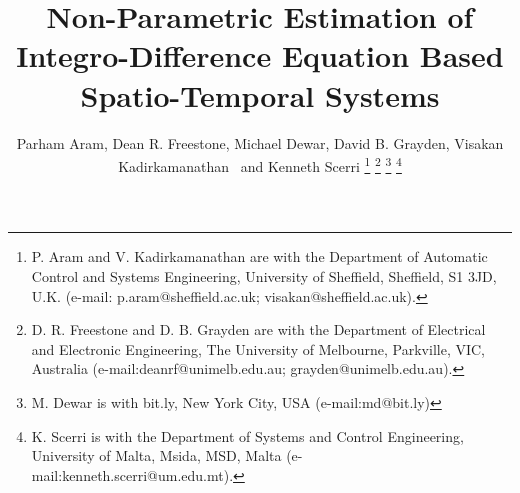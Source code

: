 \documentclass[10pt,twocolumn,twoside]{IEEEtran}
\begin{document}
%
\title{Non-Parametric Estimation of Integro-Difference Equation Based Spatio-Temporal Systems}
%
%
%

\author{Parham Aram, Dean R. Freestone, 
        Michael Dewar, David B. Grayden, Visakan Kadirkamanathan~ and Kenneth Scerri  %
\thanks{P. Aram and V. Kadirkamanathan are with the Department of Automatic Control and Systems Engineering, University of Sheffield, Sheffield, S1 3JD, U.K. (e-mail:  p.aram@sheffield.ac.uk; visakan@sheffield.ac.uk).}%
\thanks{D. R. Freestone and D. B. Grayden are with the Department of Electrical and Electronic Engineering, The University of Melbourne,
Parkville, VIC, Australia (e-mail:deanrf@unimelb.edu.au; grayden@unimelb.edu.au).}
\thanks{M. Dewar is with bit.ly, New York City, USA (e-mail:md@bit.ly)}  
\thanks{K. Scerri is with the Department of Systems and Control Engineering, University of Malta, Msida, MSD, Malta (e-mail:kenneth.scerri@um.edu.mt).}}



% 
%
\end{document}
